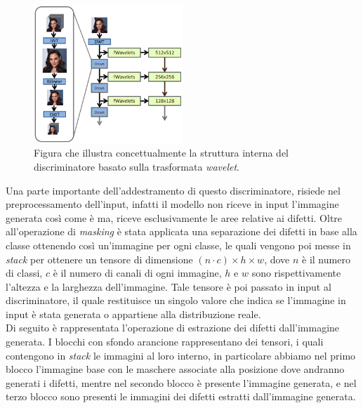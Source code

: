 \begin{figure}[H]
    \centering
    \includegraphics[width=0.5\textwidth]{imgs/Coigan/swagan_discriminator.png}
    \caption{Figura che illustra concettualmente la struttura interna del discriminatore basato sulla trasformata \textit{wavelet}.}
    \label{fig:wavelet_discriminator}
\end{figure}

Una parte importante dell'addestramento di questo discriminatore, risiede nel preprocessamento dell'input, infatti il
modello non riceve in input l'immagine generata così come è ma, riceve esclusivamente le aree relative ai difetti.
Oltre all'operazione di \textit{masking} è stata applicata una separazione dei difetti in base alla classe ottenendo così
un'immagine per ogni classe, le quali vengono poi messe in \textit{stack} per ottenere un tensore di dimensione $(n \cdot c) \times h \times w$,
dove $n$ è il numero di classi, $c$ è il numero di canali di ogni immagine, $h$ e $w$ sono rispettivamente l'altezza e la larghezza dell'immagine.
Tale tensore è poi passato in input al discriminatore, il quale restituisce un singolo valore che indica se l'immagine in input è stata generata o appartiene
alla distribuzione reale.\\
Di seguito è rappresentata l'operazione di estrazione dei difetti dall'immagine generata. 
I blocchi con sfondo arancione rappresentano dei tensori, i quali contengono in \textit{stack} le immagini al loro interno,
in particolare abbiamo nel primo blocco l'immagine base con le maschere associate alla posizione dove andranno generati i difetti,
mentre nel secondo blocco è presente l'immagine generata, e nel terzo blocco sono presenti le immagini dei difetti estratti dall'immagine generata.


